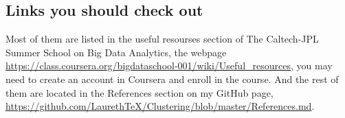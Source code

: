 \documentclass[11pt,fleqn]{book} %
\begin{document}
{																																																																																																																																																																																																																																																																																																	     \subsection{Links you should check out}
																																																																																																																																																																																																																																																																																																	     Most of them are listed in the useful resourses section of The Caltech-JPL Summer School on Big Data Analytics, the webpage \url{https://class.coursera.org/bigdataschool-001/wiki/Useful_resources}, you may need to create an account in Coursera and enroll in the course. And the rest of them are located in the References section on my GitHub page, \url{https://github.com/LaurethTeX/Clustering/blob/master/References.md}.
																																																																																																																																																																																																																																																																																																	     \vfill
}
\end{document}
